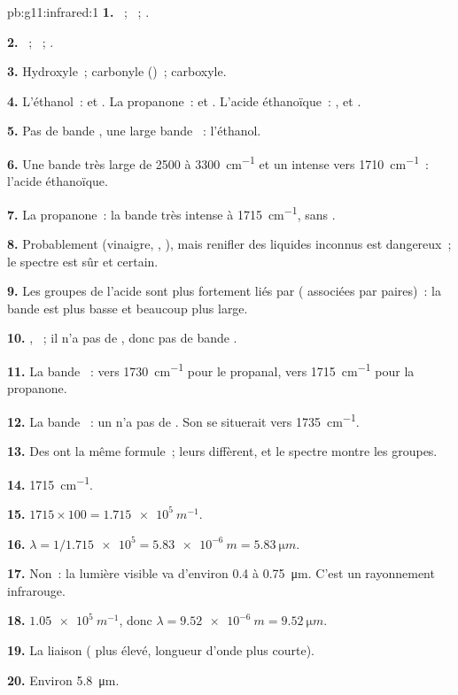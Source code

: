 \begin{solution}{pb:g11:infrared:1}
\textbf{1.} ~; ~; .

\textbf{2.} ~; ~; .

\textbf{3.} Hydroxyle~; carbonyle ()~; carboxyle.

\textbf{4.} L'éthanol~:  et . La propanone~:  et
. L'acide éthanoïque~: ,  et .

\textbf{5.} Pas de bande , une large bande ~: l'éthanol.

\textbf{6.} Une bande  très large de 2500 à \qty{3300}{cm^{-1}}
et un  intense vers \qty{1710}{cm^{-1}}~: l'acide éthanoïque.

\textbf{7.} La propanone~: la bande  très intense à
\qty{1715}{cm^{-1}}, sans .

\textbf{8.} Probablement (vinaigre, , ), mais renifler des
liquides inconnus est dangereux~; le spectre est sûr et certain.

\textbf{9.} Les groupes  de l'acide sont plus fortement liés par
 ( associées par paires)~: la bande est plus
basse et beaucoup plus large.

\textbf{10.} , ~; il n'a pas de , donc
pas de bande .

\textbf{11.} La bande ~: vers \qty{1730}{cm^{-1}} pour le
propanal, vers \qty{1715}{cm^{-1}} pour la propanone.

\textbf{12.} La bande ~: un  n'a pas de . Son
 se situerait vers \qty{1735}{cm^{-1}}.

\textbf{13.} Des  ont la même formule~; leurs  diffèrent, et le spectre montre les groupes.

\textbf{14.} \qty{1715}{cm^{-1}}.

\textbf{15.} $1715 \times 100 = \qty{1.715e5}{m^{-1}}$.

\textbf{16.} $\lambda = 1/\num{1.715e5} = \qty{5.83e-6}{m} =
\qty{5.83}{\micro m}$.

\textbf{17.} Non~: la lumière visible va d'environ 0.4 à
\qty{0.75}{\micro m}. C'est un rayonnement infrarouge.

\textbf{18.} $\num{1.05e5}\ \si{m^{-1}}$, donc $\lambda = \qty{9.52e-6}{m}
= \qty{9.52}{\micro m}$.

\textbf{19.} La liaison  ( plus élevé, longueur
d'onde plus courte).

\textbf{20.} Environ \qty{5.8}{\micro m}.
\end{solution}
